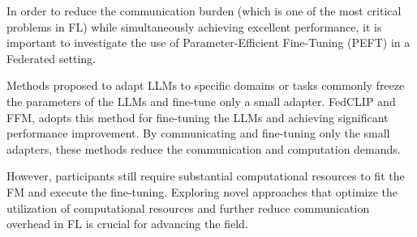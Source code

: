 \documentclass[withindex,glossary,firstyr]{cam-thesis}
\begin{document}
In order to reduce the communication burden (which is one of the most critical problems in FL) while simultaneously achieving excellent performance, it is important to investigate the use of Parameter-Efficient Fine-Tuning (PEFT) in a Federated setting.

Methods proposed to adapt LLMs to specific domains or tasks commonly freeze the parameters of the LLMs and fine-tune only a small adapter. FedCLIP and FFM, adopts this method for fine-tuning the LLMs and achieving significant performance improvement. By communicating and fine-tuning only the small adapters, these methods reduce the communication and computation demands.

However, participants still require substantial computational resources to fit the FM and execute the fine-tuning. Exploring novel approaches that optimize the utilization of computational resources and further reduce communication overhead in FL is crucial for advancing the field.


\end{document}
